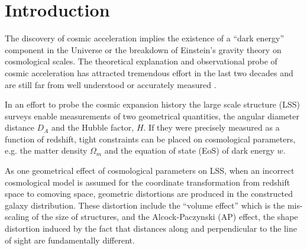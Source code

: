 \documentclass[iop]{emulateapj}
\begin{document}

\section{Introduction}

The discovery of cosmic acceleration \citep{Riess1998,Perl1999} implies the existence of a ``dark energy'' component in the Universe 
or the breakdown of Einstein's gravity theory on cosmological scales.
The theoretical explanation and observational probe of cosmic acceleration has attracted 
tremendous effort in the last two decades and are still far from well understood or accurately measured \citep{SW1989,Li2011,DHW2013}.


In an effort to probe the cosmic expansion history the large scale structure (LSS) surveys enable measurements of two geometrical quantities, 
the angular diameter distance $D_A$ and the Hubble factor, $H$. 
If they were precisely measured as a function of redshift, 
tight constraints can be placed on cosmological parameters, 
e.g. the matter density $\Omega_m$ and the equation of state (EoS) of dark energy $w$.

As one geometrical effect of cosmological parameters on LSS,  
when an incorrect cosmological model is assumed for the coordinate transformation from redshift space to comoving space,
geometric distortions are produced in the constructed galaxy distribution. 
These distortion include the ``volume effect'' which is the mis-scaling of the size of structures,
and the Alcock-Paczynski (AP) effect, the shape distortion induced by the fact that distances along and perpendicular to the line of sight are fundamentally different.
\end{document}
